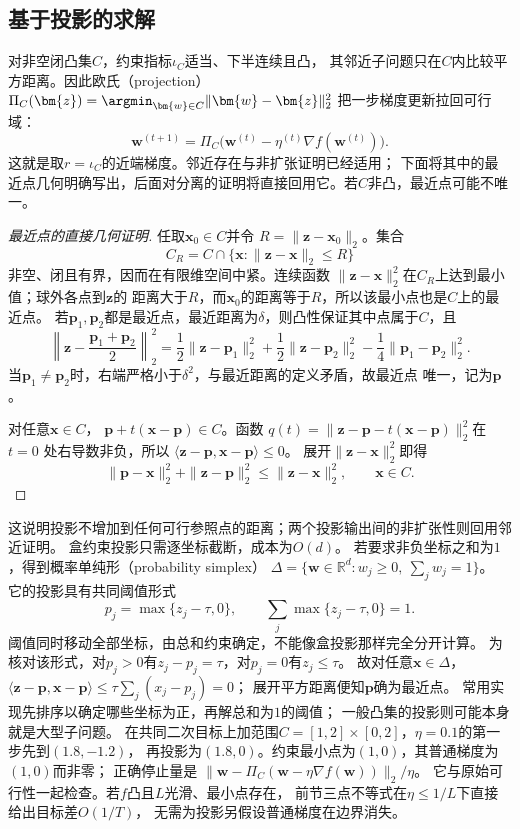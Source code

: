 \subsection{基于投影的求解}
\label{sec:opt-projected-methods}

对非空闭凸集$C$，约束指标$\iota_C$适当、下半连续且凸，
其邻近子问题只在$C$内比较平方距离。因此欧氏（projection）
$\Pi_C(\bm{z})=\argmin_{\bm{w}\in C}\lVert\bm{w}-\bm{z}\rVert_2^2$
把一步梯度更新拉回可行域：
\[
  \bm{w}^{(t+1)}
  =\Pi_C\bigl(\bm{w}^{(t)}-\eta^{(t)}\nabla f(\bm{w}^{(t)})\bigr).
\]
这就是取$r=\iota_C$的近端梯度。邻近存在与非扩张证明已经适用；
下面将其中的最近点几何明确写出，后面对分离的证明将直接回用它。若$C$非凸，最近点可能不唯一。

\begin{proof}[最近点的直接几何证明]
任取$\bm{x}_0\in C$并令
$R=\lVert\bm{z}-\bm{x}_0\rVert_2$。集合
\[
  C_R=C\cap\{\bm{x}:\lVert\bm{z}-\bm{x}\rVert_2\leq R\}
\]
非空、闭且有界，因而在有限维空间中紧。连续函数
$\lVert\bm{z}-\bm{x}\rVert_2^2$在$C_R$上达到最小值；球外各点到$\bm{z}$的
距离大于$R$，而$\bm{x}_0$的距离等于$R$，所以该最小点也是$C$上的最近点。
若$\bm{p}_1,\bm{p}_2$都是最近点，最近距离为$\delta$，则凸性保证其中点属于$C$，且
\[
  \left\lVert\bm{z}-\frac{\bm{p}_1+\bm{p}_2}{2}\right\rVert_2^2
  =
  \frac12\lVert\bm{z}-\bm{p}_1\rVert_2^2
  +\frac12\lVert\bm{z}-\bm{p}_2\rVert_2^2
  -\frac14\lVert\bm{p}_1-\bm{p}_2\rVert_2^2.
\]
当$\bm{p}_1\neq\bm{p}_2$时，右端严格小于$\delta^2$，与最近距离的定义矛盾，故最近点
唯一，记为$\bm{p}$。

对任意$\bm{x}\in C$，
$\bm{p}+t(\bm{x}-\bm{p})\in C$。函数
$q(t)=\lVert\bm{z}-\bm{p}-t(\bm{x}-\bm{p})\rVert_2^2$在$t=0$
处右导数非负，所以
$\langle\bm{z}-\bm{p},\bm{x}-\bm{p}\rangle\leq0$。
展开$\|\bm z-\bm x\|_2^2$即得
\begin{equation}
 \|\bm p-\bm x\|_2^2+\|\bm z-\bm p\|_2^2\leq\|\bm z-\bm x\|_2^2,
 \qquad \bm x\in C.
 \label{eq:opt-projection-distance}
\end{equation}
\end{proof}

这说明投影不增加到任何可行参照点的距离；两个投影输出间的非扩张性则回用邻近证明。
盒约束投影只需逐坐标截断，成本为$O(d)$。
若要求非负坐标之和为$1$，得到概率单纯形（probability simplex）
$\Delta=\{\bm w\in\mathbb R^d:w_j\geq0,\ \sum_jw_j=1\}$。
它的投影具有共同阈值形式
\[
 p_j=\max\{z_j-\tau,0\},\qquad
 \sum_j\max\{z_j-\tau,0\}=1.
\]
阈值同时移动全部坐标，由总和约束确定，不能像盒投影那样完全分开计算。
为核对该形式，对$p_j>0$有$z_j-p_j=\tau$，对$p_j=0$有$z_j\leq\tau$。
故对任意$\bm x\in\Delta$，
$\langle\bm z-\bm p,\bm x-\bm p\rangle
\leq\tau\sum_j(x_j-p_j)=0$；
展开平方距离便知$\bm p$确为最近点。
常用实现先排序以确定哪些坐标为正，再解总和为$1$的阈值；
一般凸集的投影则可能本身就是大型子问题。
在共同二次目标上加范围$C=[1,2]\times[0,2]$，$\eta=0.1$的第一步先到$(1.8,-1.2)$，
再投影为$(1.8,0)$。约束最小点为$(1,0)$，其普通梯度为$(1,0)$而非零；
正确停止量是
$\|\bm w-\Pi_C(\bm w-\eta\nabla f(\bm w))\|_2/\eta$。
它与原始可行性一起检查。若$f$凸且$L$光滑、最小点存在，
前节三点不等式在$\eta\leq1/L$下直接给出目标差$O(1/T)$，
无需为投影另假设普通梯度在边界消失。

